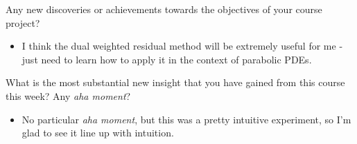 Any new discoveries or achievements towards the objectives of your course project?

\vspace*{3mm}

\begin{itemize}
\item I think the dual weighted residual method will be extremely useful for me - just need to learn how to apply it in the context of parabolic PDEs.
\end{itemize}

\vspace*{5mm}

What is the most substantial new insight that you have gained from this course this week? Any \emph{aha moment}?

\vspace*{3mm}

\begin{itemize}
\item No particular \emph{aha moment}, but this was a pretty intuitive experiment, so I'm glad to see it line up with intuition.
\end{itemize}

\vspace*{3mm}


